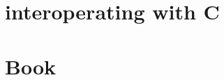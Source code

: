 \documentclass[svgnames,12pt,a4paper]{report}
\begin{document}
\chapter{interoperating with C}
\label{sec:inter-with-c}




\chapter{Book}





















\end{document}
